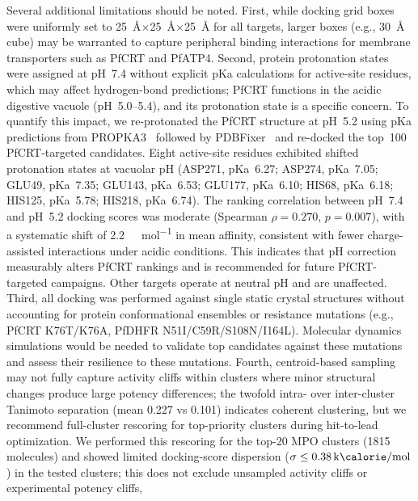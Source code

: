 \documentclass[journal=jcisd8,manuscript=article]{achemso}
\begin{document}
Several additional limitations should be noted. First, while docking grid boxes were uniformly set to
\qty{25}{\angstrom}$\times$\qty{25}{\angstrom}$\times$\qty{25}{\angstrom} for all targets, larger boxes (e.g., \qty{30}{\angstrom} cube) may be warranted to
capture peripheral binding interactions for membrane transporters such as PfCRT and PfATP4. Second, protein protonation states were assigned at pH~\num{7.4} without
explicit pKa calculations for active-site residues, which may affect hydrogen-bond predictions; PfCRT functions in the acidic digestive vacuole (pH~5.0--5.4),
and its protonation state is a specific concern. To quantify this impact, we re-protonated the PfCRT structure at pH~\num{5.2} using pKa predictions from
PROPKA3~\cite{Olsson2011} followed by PDBFixer~\cite{Eastman2017} and re-docked the top~100 PfCRT-targeted candidates. Eight active-site residues exhibited
shifted protonation states at vacuolar pH (ASP271, pKa~\num{6.27}; ASP274, pKa~\num{7.05}; GLU49, pKa~\num{7.35}; GLU143, pKa~\num{6.53}; GLU177, pKa~\num{6.10}; HIS68, pKa~\num{6.18}; HIS125,
pKa~\num{5.78}; HIS218, pKa~\num{6.74}). The ranking correlation between pH~\num{7.4} and pH~\num{5.2} docking scores was moderate (Spearman $\rho = \num{0.270}$, $p = \num{0.007}$),
with a systematic shift of \qty{+2.2}{\kilo\calorie\per\mole} in mean affinity, consistent with fewer charge-assisted interactions under acidic conditions. This
indicates that pH correction measurably alters PfCRT rankings and is recommended for future PfCRT-targeted campaigns. Other targets operate at neutral pH and are
unaffected. Third, all docking was performed against single static crystal structures without accounting for protein conformational ensembles or resistance
mutations (e.g., PfCRT K76T/K76A, PfDHFR N51I/C59R/S108N/I164L). Molecular dynamics simulations would be needed to validate top candidates against these
mutations and assess their resilience to these mutations. Fourth, centroid-based sampling may not fully capture activity cliffs within clusters where minor
structural changes produce large potency differences; the twofold intra- over inter-cluster Tanimoto separation (mean \num{0.227} vs \num{0.101}) indicates
coherent clustering, but we recommend full-cluster rescoring for top-priority clusters during hit-to-lead optimization. We performed this rescoring for the
top-20 MPO clusters (\num{1815} molecules) and showed limited docking-score dispersion ($\sigma \leq \qty{0.38}{\kilo\calorie\per\mole}$) in the tested clusters; this does not exclude unsampled activity cliffs or experimental potency cliffs,
\end{document}

